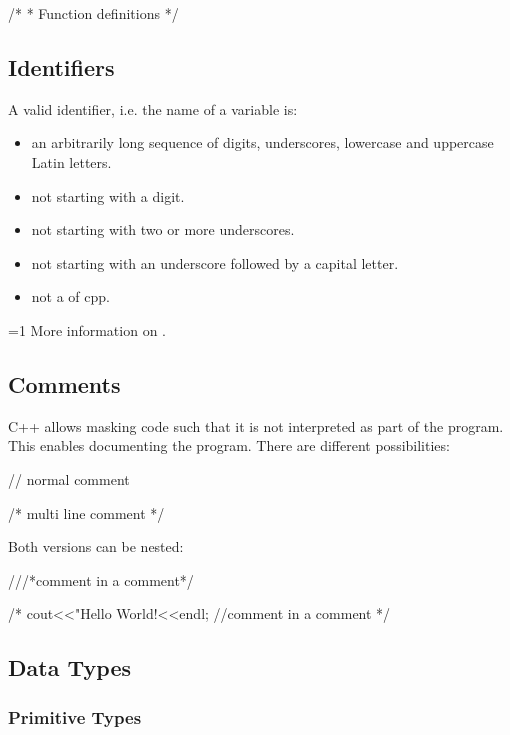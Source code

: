 \documentclass[10pt,a4paper]{scrartcl}
\gdef\conditionmacro{1}
\begin{document}
\begin{multicols*}{2}
\begin{TPCpp}
/*
 * Function definitions
 */
\end{TPCpp}

\subsection{Identifiers}

A valid identifier, i.e. the name of a variable is:

\begin{itemize}
\item an arbitrarily long sequence of digits, underscores, lowercase and uppercase Latin letters.
\item not starting with a digit.
\item not starting with two or more underscores.
\item not starting with an underscore followed by a capital letter.
\item not a  of cpp.
\end{itemize}

\ifnum\conditionmacro=1
More information on .
\fi

\subsection{Comments}

C++ allows masking code such that it is not interpreted as part of the program. This enables documenting the program. There are different possibilities:

\begin{TPCpp}
// normal comment

/*
multi
line
comment
*/
\end{TPCpp}

Both versions can be nested:

\begin{TPCpp}
///*comment in a comment*/

/*
cout<<"Hello World!<<endl; //comment in a comment
*/
\end{TPCpp}

\subsection{Data Types}

\subsubsection{Primitive Types}


\end{multicols*}
\end{document}
